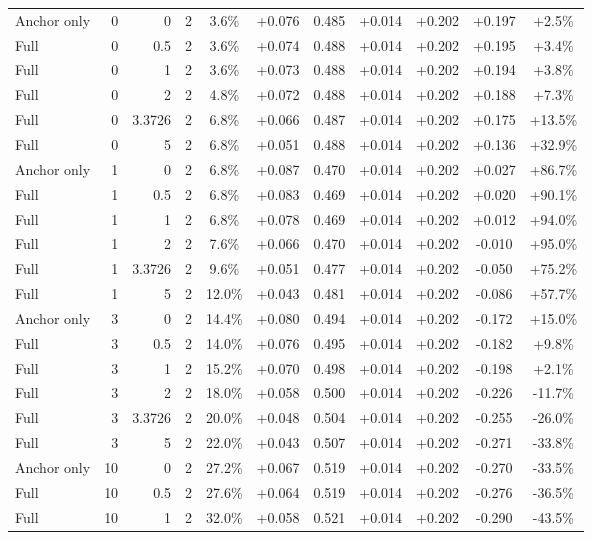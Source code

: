 \begin{table}[htbp]
\begin{tabular}{lrrrccccccc}
Anchor only & 0 & 0 & 2 & 3.6\% & +0.076 & 0.485 & +0.014 & +0.202 & +0.197 & +2.5\% \\
Full & 0 & 0.5 & 2 & 3.6\% & +0.074 & 0.488 & +0.014 & +0.202 & +0.195 & +3.4\% \\
Full & 0 & 1 & 2 & 3.6\% & +0.073 & 0.488 & +0.014 & +0.202 & +0.194 & +3.8\% \\
Full & 0 & 2 & 2 & 4.8\% & +0.072 & 0.488 & +0.014 & +0.202 & +0.188 & +7.3\% \\
Full & 0 & 3.3726 & 2 & 6.8\% & +0.066 & 0.487 & +0.014 & +0.202 & +0.175 & +13.5\% \\
Full & 0 & 5 & 2 & 6.8\% & +0.051 & 0.488 & +0.014 & +0.202 & +0.136 & +32.9\% \\
Anchor only & 1 & 0 & 2 & 6.8\% & +0.087 & 0.470 & +0.014 & +0.202 & +0.027 & +86.7\% \\
Full & 1 & 0.5 & 2 & 6.8\% & +0.083 & 0.469 & +0.014 & +0.202 & +0.020 & +90.1\% \\
Full & 1 & 1 & 2 & 6.8\% & +0.078 & 0.469 & +0.014 & +0.202 & +0.012 & +94.0\% \\
Full & 1 & 2 & 2 & 7.6\% & +0.066 & 0.470 & +0.014 & +0.202 & -0.010 & +95.0\% \\
Full & 1 & 3.3726 & 2 & 9.6\% & +0.051 & 0.477 & +0.014 & +0.202 & -0.050 & +75.2\% \\
Full & 1 & 5 & 2 & 12.0\% & +0.043 & 0.481 & +0.014 & +0.202 & -0.086 & +57.7\% \\
Anchor only & 3 & 0 & 2 & 14.4\% & +0.080 & 0.494 & +0.014 & +0.202 & -0.172 & +15.0\% \\
Full & 3 & 0.5 & 2 & 14.0\% & +0.076 & 0.495 & +0.014 & +0.202 & -0.182 & +9.8\% \\
Full & 3 & 1 & 2 & 15.2\% & +0.070 & 0.498 & +0.014 & +0.202 & -0.198 & +2.1\% \\
Full & 3 & 2 & 2 & 18.0\% & +0.058 & 0.500 & +0.014 & +0.202 & -0.226 & -11.7\% \\
Full & 3 & 3.3726 & 2 & 20.0\% & +0.048 & 0.504 & +0.014 & +0.202 & -0.255 & -26.0\% \\
Full & 3 & 5 & 2 & 22.0\% & +0.043 & 0.507 & +0.014 & +0.202 & -0.271 & -33.8\% \\
Anchor only & 10 & 0 & 2 & 27.2\% & +0.067 & 0.519 & +0.014 & +0.202 & -0.270 & -33.5\% \\
Full & 10 & 0.5 & 2 & 27.6\% & +0.064 & 0.519 & +0.014 & +0.202 & -0.276 & -36.5\% \\
Full & 10 & 1 & 2 & 32.0\% & +0.058 & 0.521 & +0.014 & +0.202 & -0.290 & -43.5\% \\

\end{tabular}
\end{table}
